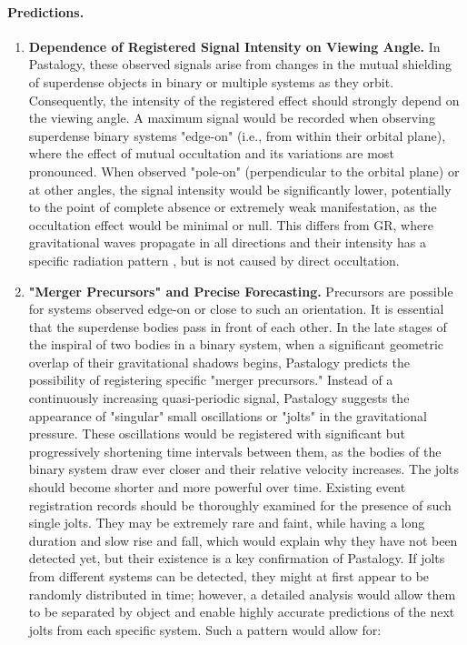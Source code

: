 \documentclass[pdflatex,sn-mathphys-num,referee]{sn-jnl}
\begin{document}
\paragraph{Predictions.}
\begin{enumerate}
    \item \textbf{Dependence of Registered Signal Intensity on Viewing Angle.} In Pastalogy, these observed signals arise from changes in the mutual shielding of superdense objects in binary or multiple systems as they orbit. Consequently, the intensity of the registered effect should strongly depend on the viewing angle. A maximum signal would be recorded when observing superdense binary systems "edge-on" (i.e., from within their orbital plane), where the effect of mutual occultation and its variations are most pronounced. When observed "pole-on" (perpendicular to the orbital plane) or at other angles, the signal intensity would be significantly lower, potentially to the point of complete absence or extremely weak manifestation, as the occultation effect would be minimal or null. This differs from GR, where gravitational waves propagate in all directions and their intensity has a specific radiation pattern \cite{maggiore2007-gw}, but is not caused by direct occultation.
    \item \textbf{"Merger Precursors" and Precise Forecasting.} Precursors are possible for systems observed edge-on or close to such an orientation. It is essential that the superdense bodies pass in front of each other. In the late stages of the inspiral of two bodies in a binary system, when a significant geometric overlap of their gravitational shadows begins, Pastalogy predicts the possibility of registering specific "merger precursors." Instead of a continuously increasing quasi-periodic signal, Pastalogy suggests the appearance of "singular" small oscillations or "jolts" in the gravitational pressure. These oscillations would be registered with significant but progressively shortening time intervals between them, as the bodies of the binary system draw ever closer and their relative velocity increases. The jolts should become shorter and more powerful over time. Existing event registration records should be thoroughly examined for the presence of such single jolts. They may be extremely rare and faint, while having a long duration and slow rise and fall, which would explain why they have not been detected yet, but their existence is a key confirmation of Pastalogy. If jolts from different systems can be detected, they might at first appear to be randomly distributed in time; however, a detailed analysis would allow them to be separated by object and enable highly accurate predictions of the next jolts from each specific system. Such a pattern would allow for:

\end{enumerate}
\end{document}
